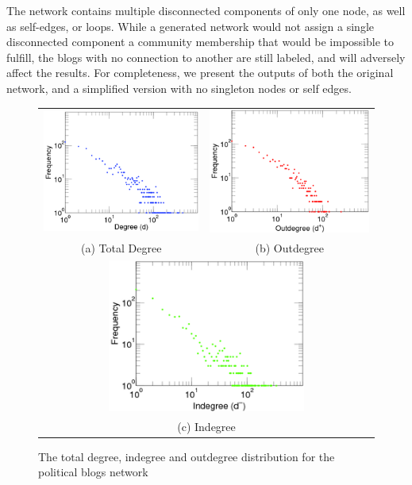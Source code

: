 The network contains multiple disconnected components of only one node, as well as self-edges, or loops. While a generated network would not assign a single disconnected component a community membership that would be impossible to fulfill, the blogs with no connection to another are still labeled, and will adversely affect the results. For completeness, we present the outputs of both the original network, and a simplified version with no singleton nodes or self edges. 

\begin{figure}
	\begin{tabular}{cc}
		\includegraphics[width=65mm]{images/blogs_total.png} &   \includegraphics[width=65mm]{images/blogs_out.png} \\
		(a) Total Degree & (b) Outdegree \\[6pt]
		\multicolumn{2}{c}{\includegraphics[width=65mm]{images/blogs_in.png} }\\
		\multicolumn{2}{c}{(c) Indegree}
	\end{tabular}
	\caption{The total degree, indegree and outdegree distribution for the political blogs network\cite{Kunegis2013}}
\end{figure}



